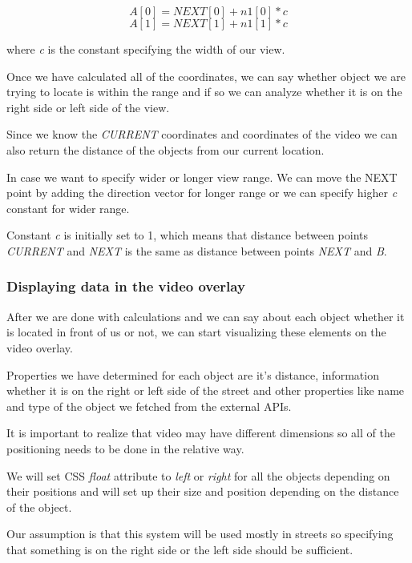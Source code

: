 \documentclass[journal]{IEEEtran}
\begin{document}
\begin{displaymath}
A[0] = NEXT[0] + n1[0]*c
\end{displaymath}
\begin{displaymath}
A[1] = NEXT[1] + n1[1]*c
\end{displaymath}

where \textit{c} is the constant specifying the width of our view.

Once we have calculated all of the coordinates, we can say whether object we are trying to locate is within the range and if so we can analyze whether it is on the right side or left side of the view.

Since we know the \textit{CURRENT} coordinates and coordinates of the video we can also return the distance of the objects from our current location.

In case we want to specify wider or longer view range. We can move the NEXT point by adding the direction vector for longer range or we can specify higher \textit{c} constant for wider range.

Constant \textit{c} is initially set to 1, which means that distance between points \textit{CURRENT} and \textit{NEXT} is the same as distance between points \textit{NEXT} and \textit{B}.

\subsubsection{Displaying data in the video overlay}

After we are done with calculations and we can say about each object whether it is located in front of us or not, we can start visualizing these elements on the video overlay.

Properties we have determined for each object are it's distance, information whether it is on the right or left side of the street and other properties like name and type of the object we fetched from the external APIs.

It is important to realize that video may have different dimensions so all of the positioning needs to be done in the relative way.

We will set CSS \textit{float} attribute to \textit{left} or \textit{right} for all the objects depending on their positions and will set up their size and position depending on the distance of the object.

Our assumption is that this system will be used mostly in streets so specifying that something is on the right side or the left side should be sufficient.
\end{document}
